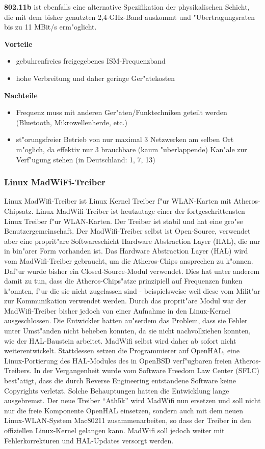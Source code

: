 \textbf{802.11b} ist ebenfalls eine alternative Spezifikation der physikalischen
Schicht, die mit dem bisher genutzten 2,4-GHz-Band auskommt und
"Ubertragungsraten bis zu 11 MBit/s erm"oglicht. 

\textbf{Vorteile}
\begin{itemize}	
	\item gebuhrenfreies freigegebenes ISM-Frequenzband 
	\item hohe Verbreitung und daher geringe Ger"atekosten 
\end{itemize}

\textbf{Nachteile}
\begin{itemize}	
	\item Frequenz muss mit anderen Ger"aten/Funktechniken geteilt werden
	(Bluetooth, Mikrowellenherde, etc.) 
	\item st"orungsfreier Betrieb von nur maximal 3 Netzwerken
	am selben Ort m"oglich, da effektiv nur 3 brauchbare
	(kaum "uberlappende) Kan"ale zur Verf"ugung stehen
	(in Deutschland: 1, 7, 13) 
\end{itemize}


\subsubsection{Linux MadWiFi-Treiber}

Linux MadWifi-Treiber ist Linux Kernel Treiber f"ur WLAN-Karten mit
Atheros-Chipsatz. Linux MadWifi-Treiber ist heutzutage einer der
fortgeschrittensten Linux Treiber f"ur WLAN-Karten. Der Treiber ist
stabil und hat eine gro"se Benutzergemeinschaft. Der MadWifi-Treiber
selbst ist Open-Source, verwendet aber eine proprit"are Softwareschicht
Hardware Abstraction Layer (HAL), die nur in bin"arer Form vorhanden
ist. Das Hardware Abstraction Layer (HAL) wird vom MadWifi-Treiber
gebraucht, um die Atheros-Chips ansprechen zu k"onnen. Daf"ur wurde bisher
ein Closed-Source-Modul verwendet. Dies hat unter anderem damit zu tun,
dass die Atheros-Chips"atze prinzipiell auf Frequenzen funken k"onnten,
f"ur die sie nicht zugelassen sind - beispielsweise weil diese vom
Milit"ar zur Kommunikation verwendet werden. Durch das proprit"are
Modul war der MadWifi-Treiber bisher jedoch von einer Aufnahme in den
Linux-Kernel ausgeschlossen. Die Entwickler hatten au"serdem das Problem,
dass sie Fehler unter Umst"anden nicht beheben konnten, da sie nicht
nachvollziehen konnten, wie der HAL-Baustein arbeitet. MadWifi
selbst wird daher ab sofort nicht weiterentwickelt. Stattdessen
setzen die Programmierer auf OpenHAL, eine Linux-Portierung des
HAL-Modules des in OpenBSD verf"ugbaren freien Atheros-Treibers. In der
Vergangenheit wurde vom Software Freedom Law Center (SFLC) best"atigt,
dass die durch Reverse Engineering entstandene Software keine Copyrights
verletzt. Solche Behauptungen hatten die Entwicklung lange ausgebremst. 
Der neue Treiber "`Ath5k"' wird MadWifi nun ersetzen und soll nicht
nur die freie Komponente OpenHAL einsetzen, sondern auch mit dem neuen
Linux-WLAN-System Mac80211 zusammenarbeiten, so dass der Treiber in den
offiziellen Linux-Kernel gelangen kann. MadWifi soll jedoch weiter mit
Fehlerkorrekturen und HAL-Updates versorgt werden. 

